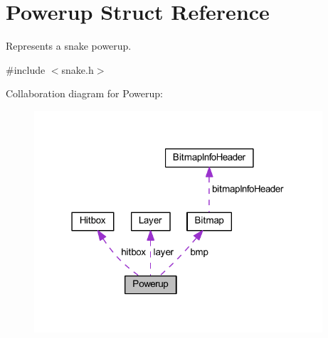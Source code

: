 \hypertarget{struct_powerup}{}\section{Powerup Struct Reference}
\label{struct_powerup}


Represents a snake powerup.  




{\ttfamily \#include $<$snake.\+h$>$}



Collaboration diagram for Powerup\+:\nopagebreak
\begin{figure}[H]
\begin{center}
\leavevmode
\includegraphics[width=304pt]{struct_powerup__coll__graph}
\end{center}
\end{figure}
